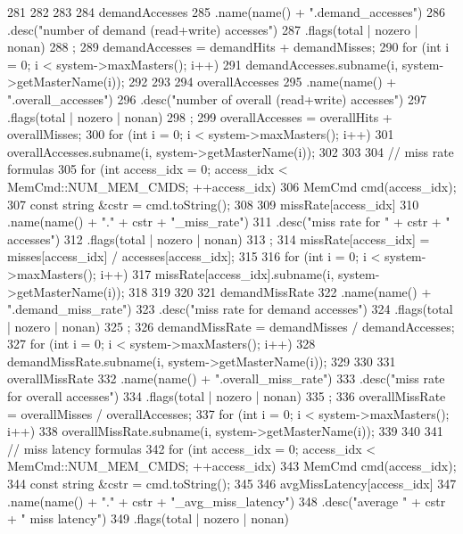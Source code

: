 \begin{DoxyCode}
{{{281         }
282     }
283 
284     demandAccesses
285         .name(name() + ".demand_accesses")
286         .desc("number of demand (read+write) accesses")
287         .flags(total | nozero | nonan)
288         ;
289     demandAccesses = demandHits + demandMisses;
290     for (int i = 0; i < system->maxMasters(); i++) {
291         demandAccesses.subname(i, system->getMasterName(i));
292     }
293 
294     overallAccesses
295         .name(name() + ".overall_accesses")
296         .desc("number of overall (read+write) accesses")
297         .flags(total | nozero | nonan)
298         ;
299     overallAccesses = overallHits + overallMisses;
300     for (int i = 0; i < system->maxMasters(); i++) {
301         overallAccesses.subname(i, system->getMasterName(i));
302     }
303 
304     // miss rate formulas
305     for (int access_idx = 0; access_idx < MemCmd::NUM_MEM_CMDS; ++access_idx) {
306         MemCmd cmd(access_idx);
307         const string &cstr = cmd.toString();
308 
309         missRate[access_idx]
310             .name(name() + "." + cstr + "_miss_rate")
311             .desc("miss rate for " + cstr + " accesses")
312             .flags(total | nozero | nonan)
313             ;
314         missRate[access_idx] = misses[access_idx] / accesses[access_idx];
315 
316         for (int i = 0; i < system->maxMasters(); i++) {
317             missRate[access_idx].subname(i, system->getMasterName(i));
318         }
319     }
320 
321     demandMissRate
322         .name(name() + ".demand_miss_rate")
323         .desc("miss rate for demand accesses")
324         .flags(total | nozero | nonan)
325         ;
326     demandMissRate = demandMisses / demandAccesses;
327     for (int i = 0; i < system->maxMasters(); i++) {
328         demandMissRate.subname(i, system->getMasterName(i));
329     }
330 
331     overallMissRate
332         .name(name() + ".overall_miss_rate")
333         .desc("miss rate for overall accesses")
334         .flags(total | nozero | nonan)
335         ;
336     overallMissRate = overallMisses / overallAccesses;
337     for (int i = 0; i < system->maxMasters(); i++) {
338         overallMissRate.subname(i, system->getMasterName(i));
339     }
340 
341     // miss latency formulas
342     for (int access_idx = 0; access_idx < MemCmd::NUM_MEM_CMDS; ++access_idx) {
343         MemCmd cmd(access_idx);
344         const string &cstr = cmd.toString();
345 
346         avgMissLatency[access_idx]
347             .name(name() + "." + cstr + "_avg_miss_latency")
348             .desc("average " + cstr + " miss latency")
349             .flags(total | nozero | nonan)
}}
\end{DoxyCode}
